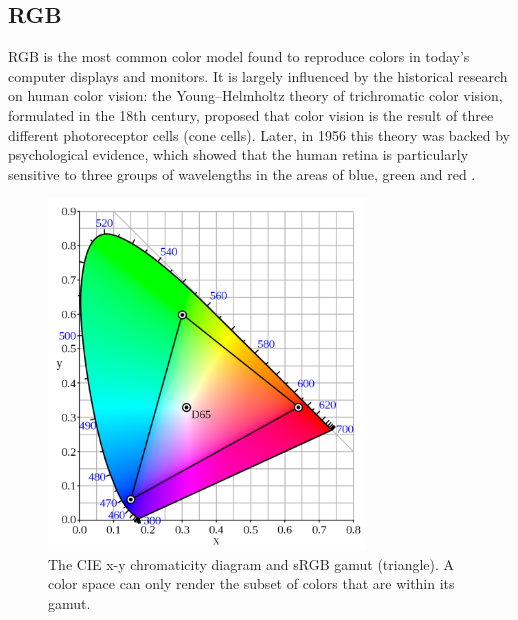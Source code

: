 \documentclass[thesis.tex]{subfiles}
\begin{document}
\subsection{RGB}
RGB is the most common color model found to reproduce colors in today's computer displays and monitors. It is largely influenced by the historical research on human color vision: the Young–Helmholtz theory of trichromatic color vision, formulated in the 18th century, proposed that color vision is the result of three different photoreceptor cells (cone cells). Later, in 1956 this theory was backed by psychological evidence, which showed that the human retina is particularly sensitive to three groups of wavelengths in the areas of blue, green and red \cite{svaetichin}.

\begin{figure}[h]
\centering \includegraphics[width=0.75\textwidth]{images/srgb}
\caption{The CIE x-y chromaticity diagram and sRGB gamut (triangle). A color space can only render the subset of colors that are within its gamut.\label{figure:srgb}}
\end{figure}
\end{document}
